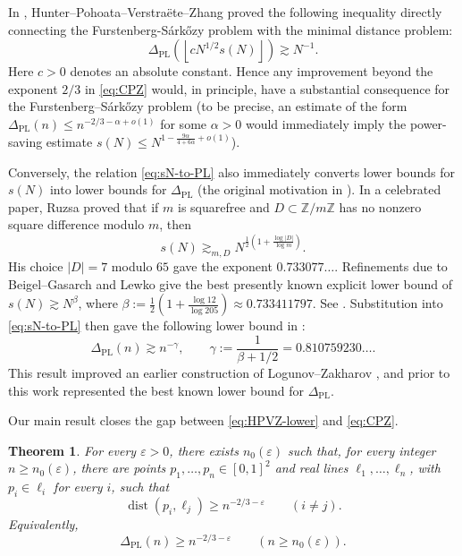 \documentclass[11pt,reqno]{amsart}
\newtheorem{theorem}{Theorem}[section]
\theoremstyle{definition}
\theoremstyle{remark}
\newcommand{\Z}{\mathbb{Z}}
\newcommand{\eps}{\varepsilon}
\newcommand{\dist}{\operatorname{dist}}
\newcommand{\PL}{\Delta_{\mathrm{PL}}}
\begin{document}
In \cite[Theorem~1.15 and Proposition~2.3]{HPVZ2026}, Hunter--Pohoata--Verstra\"ete--Zhang proved the following inequality directly connecting the Furstenberg-S\'ark\H{o}zy problem with the minimal distance problem:
\begin{equation}
\label{eq:sN-to-PL}
        \PL\!\left(\left\lfloor cN^{1/2}s(N)\right\rfloor\right)
        \gtrsim N^{-1}.
\end{equation}
Here $c>0$ denotes an absolute constant. Hence any improvement beyond the exponent $2/3$ in \eqref{eq:CPZ} would, in principle, have a substantial consequence for the Furstenberg--S\'ark\H{o}zy
problem (to be precise, an estimate of the form $\PL(n)\le n^{-2/3-\alpha+o(1)}$ for some $\alpha>0$ would immediately imply the power-saving estimate $s(N) \le N^{1-\frac{9\alpha}{4+6\alpha}+o(1)}$).

Conversely, the relation \eqref{eq:sN-to-PL} also immediately converts lower bounds for $s(N)$ into lower bounds for $\PL$ (the original motivation in \cite{HPVZ2026}). In a celebrated paper, Ruzsa
\cite{Ruzsa1984} proved that if $m$ is squarefree and
$D\subset\Z/m\Z$ has no nonzero square difference modulo $m$, then
\begin{equation}
\label{eq:Ruzsa-lower}
        s(N)\gtrsim_{m,D}
        N^{\frac12\left(1+\frac{\log|D|}{\log m}\right)}.
\end{equation}
His choice $|D|=7$ modulo $65$ gave the exponent
$0.733077\ldots$.  Refinements due to Beigel--Gasarch and Lewko give
the best presently known explicit lower bound of $s(N)\gtrsim N^{\beta}$, where $\beta:=\frac12\left(1+\frac{\log 12}{\log 205}\right) \approx 0.733411797$. See \cite{BeigelGasarch2008,Lewko2015}. Substitution into
\eqref{eq:sN-to-PL} then gave the following lower bound in \cite{HPVZ2026}:
\begin{equation}
\label{eq:HPVZ-lower}
        \PL(n)\gtrsim n^{-\gamma},
        \qquad
        \gamma
        :=\frac1{\beta+1/2}
        =0.810759230\ldots.
\end{equation}
This result improved an earlier construction of Logunov--Zakharov
\cite{LogunovZakharov2025}, and prior to this work represented the best known lower bound for $\PL$. 

Our main result closes the gap between \eqref{eq:HPVZ-lower} and \eqref{eq:CPZ}. 

\begin{theorem}
\label{thm:main}
For every $\eps>0$, there exists $n_0(\eps)$ such that, for every integer
$n\ge n_0(\eps)$, there are points $p_1,\ldots,p_n\in[0,1]^2$ and real
lines $\ell_1,\ldots,\ell_n$, with $p_i\in\ell_i$ for every $i$, such
that
\[
        \dist(p_i,\ell_j)\ge n^{-2/3-\eps}
        \qquad(i\ne j).
\]
Equivalently,
\[
        \PL(n)\ge n^{-2/3-\eps}
        \qquad(n\ge n_0(\eps)).
\]
\end{theorem}
\end{document}
